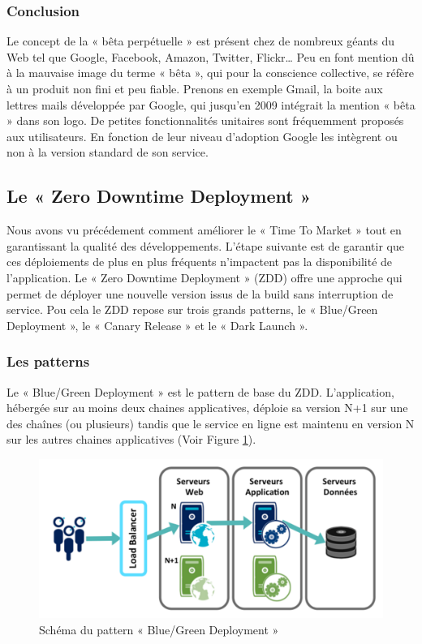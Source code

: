       \subsubsection{Conclusion}
      Le concept de la « bêta perpétuelle » est présent chez de nombreux géants du Web tel que Google, Facebook, Amazon, Twitter, Flickr… Peu en font mention dû à la mauvaise image du terme « bêta », qui pour la conscience collective, se réfère à un produit non fini et peu fiable. Prenons en exemple Gmail, la boite aux lettres mails développée par Google, qui jusqu’en 2009 intégrait la mention « bêta » dans son logo. De petites fonctionnalités unitaires sont fréquemment proposés aux utilisateurs. En fonction de leur niveau d’adoption Google les intègrent ou non à la version standard de son service.

      \subsection{Le « Zero Downtime Deployment »}
      Nous avons vu précédement comment améliorer le « Time To Market » tout en garantissant la qualité des développements. L'étape suivante est de garantir que ces déploiements de plus en plus fréquents n'impactent pas la disponibilité de l'application. Le « Zero Downtime Deployment » (ZDD) offre une approche qui permet de déployer une nouvelle version issus de la build sans interruption de service. Pou cela le ZDD repose sur trois grands patterns, le « Blue/Green Deployment », le « Canary Release » et le « Dark Launch ».
        \subsubsection{Les patterns}
        Le « Blue/Green Deployment » est le pattern de base du ZDD. L’application, hébergée sur au moins deux chaines applicatives, déploie sa version N+1 sur une des chaînes (ou plusieurs) tandis que le service en ligne est maintenu en version N sur les autres chaines applicatives (Voir Figure \ref{BlueGreen}).\\

        \begin{figure}
          \begin{center}
            \includegraphics[scale=0.7]{images/BlueGreenDeployment.png}
          \end{center}
          \caption{Schéma du pattern « Blue/Green Deployment »}
          \label{BlueGreen}
        \end{figure}

